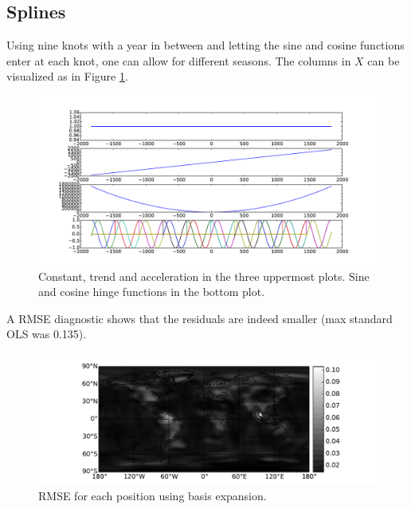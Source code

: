 \subsection{Splines}
\label{section:result-splines}

Using nine knots with a year in between and letting the sine and cosine functions enter at each knot, one can allow for different seasons. The columns in $X$ can be visualized as in Figure \ref{fig:splines-x-columns}.
\begin{figure}[H]
	\centering
	\includegraphics[width=\textwidth]{figures/splines-x-columns}
	\caption{Constant, trend and acceleration in the three uppermost plots. Sine and cosine hinge functions in the bottom plot.}
	\label{fig:splines-x-columns}
\end{figure}

A RMSE diagnostic shows that the residuals are indeed smaller (max standard OLS was 0.135).

\begin{figure}[H]
	\centering
	\includegraphics[width=\textwidth]{figures/splines-rmse}
	\caption{RMSE for each position using basis expansion.}
	\label{fig:splines-rmse}
\end{figure}

